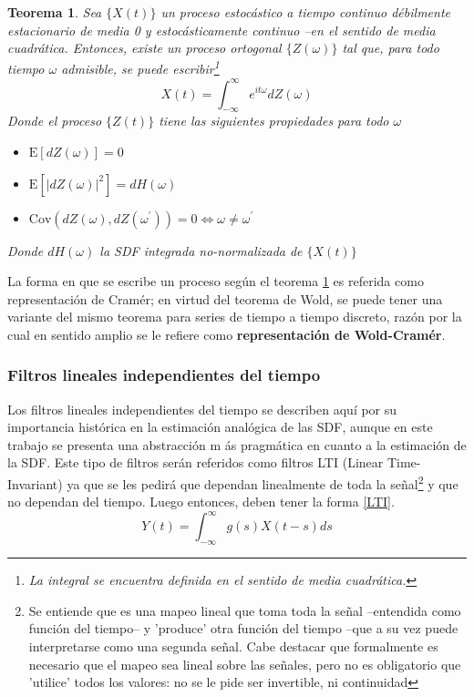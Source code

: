 \documentclass[12pt,a4paper]{mitthesis}
\newtheorem{thrm}{Teorema}
\newcommand{\intR}{\int_{-\infty}^{\infty}}
\newcommand{\E}[1]{\mathrm{E}\left[ #1 \right]}
\newcommand{\Cov}[1]{\mathrm{Cov}\left( #1 \right)}
\newcommand{\abso}[1]{\left| #1 \right|}
\begin{document}
\begin{thrm}
Sea $\{X(t)\}$ un proceso estoc\'astico a tiempo continuo d\'ebilmente estacionario de media 0 y 
estoc\'asticamente continuo --en el sentido de media cuadr\'atica. Entonces, existe un proceso 
ortogonal $\{Z(\omega)\}$ tal que, para todo tiempo $\omega$ admisible, se puede 
escribir\footnote{La integral se encuentra definida en el sentido de media cuadr\'atica.}
\begin{equation*}
X(t) = \intR e^{i t \omega} dZ(\omega)
\end{equation*}
Donde el proceso $\{Z(t)\}$ tiene las siguientes propiedades para todo $\omega$
\begin{itemize}
\item $\E{dZ(\omega)} = 0$
\item $\E{\abso{dZ(\omega)}^{2}} = dH(\omega)$
\item $\Cov{dZ(\omega),dZ(\omega^{\prime})} = 0 \Leftrightarrow \omega \neq \omega^{\prime}$
\end{itemize}
Donde $dH(\omega)$ la SDF integrada no-normalizada de $\{X(t)\}$
\label{rep_espectral}
\end{thrm}

La forma en que se escribe un proceso seg\'un el teorema \ref{rep_espectral} es referida como
{representaci\'on de Cram\'er}; en virtud del teorema de Wold, se puede tener una variante del 
mismo teorema para series de tiempo a tiempo discreto, raz\'on por la cual en sentido amplio se le 
refiere como \textbf{representaci\'on de Wold-Cram\'er}.


\subsubsection{Filtros lineales independientes del tiempo}

Los filtros lineales independientes del tiempo se describen aqu\'i por su importancia hist\'orica 
en la estimaci\'on anal\'ogica de las SDF, aunque en este trabajo se presenta una abstracci\'on m
\'as pragm\'atica en cuanto a la estimaci\'on de la SDF.
Este tipo de filtros ser\'an referidos como filtros LTI (Linear Time-Invariant) ya que se les 
pedir\'a que dependan linealmente de toda la se\~nal\footnote{Se entiende que es una mapeo lineal 
que toma toda la se\~nal --entendida como funci\'on del tiempo-- y 'produce' otra funci\'on del 
tiempo --que a su vez puede interpretarse como una segunda se\~nal. Cabe destacar que formalmente 
es necesario que el mapeo sea lineal sobre las se\~nales, pero no es obligatorio que 'utilice' 
todos los valores: no se le pide ser invertible, ni continuidad} y que no dependan del tiempo. 
Luego entonces, deben tener la forma \ref{LTI}.
\begin{equation*}
Y(t) = \intR g(s) X(t-s) ds
\label{LTI}
\end{equation*}
\end{document}

